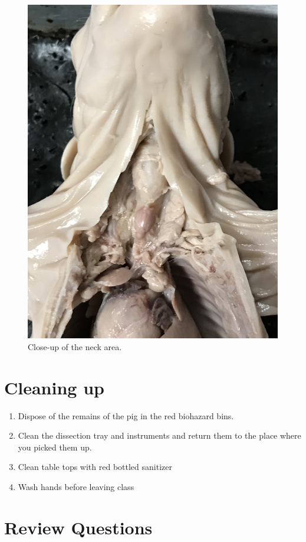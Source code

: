 \begin{figure}

{\centering \includegraphics[width=0.7\linewidth]{./figures/pig/pig_neck} 

}

\caption{Close-up of the neck area.}\label{fig:neck}
\end{figure}

\section{Cleaning up}\label{cleaning-up}

\begin{enumerate}
\def\labelenumi{\arabic{enumi}.}
\tightlist
\item
  Dispose of the remains of the pig in the red biohazard bins.
\item
  Clean the dissection tray and instruments and return them to the place where you picked them up.
\item
  Clean table tops with red bottled sanitizer
\item
  Wash hands before leaving class
\end{enumerate}

\section{Review Questions}\label{review-questions}

